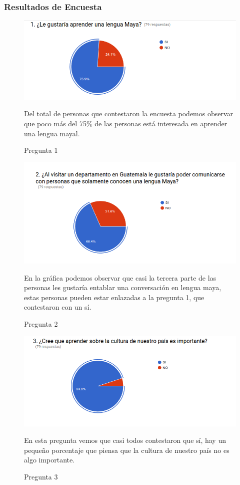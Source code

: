 \documentclass[a4paper,openright,11pt]{article}
\begin{document}
\subsubsection{Resultados de Encuesta}
\begin{figure}[h]
	\centering
	\includegraphics[width=1.0\textwidth]{e1}
	\caption{Pregunta 1}
	\label{fig:e1}
	Del total de personas que contestaron la encuesta podemos observar que poco más del 75\% de las personas está interesada en aprender una lengua mayal.
\end{figure}
\begin{figure}
	\centering
	\includegraphics[width=1.0\textwidth]{e2}
	\caption{Pregunta 2}
	\label{fig:e2}
	En la gráfica podemos observar que casi la tercera parte de las personas les gustaría entablar una conversación en lengua maya, estas personas pueden estar enlazadas a la pregunta 1, que contestaron con un sí.
\end{figure}
\begin{figure}
	\centering
	\includegraphics[width=1.0\textwidth]{e3}
	\caption{Pregunta 3}
	\label{fig:e3}
	En esta pregunta vemos que casi todos contestaron que sí, hay un pequeño porcentaje que piensa que la cultura de nuestro país no es algo importante.
\end{figure}
\end{document}
